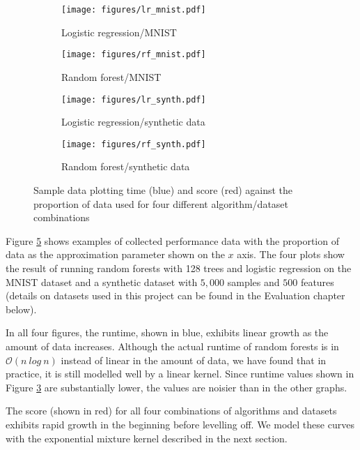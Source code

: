 \documentclass[a4paper,12pt,twoside,openright]{report}
\begin{document}
\begin{figure}[t]
\centering
\begin{subfigure}{.45\textwidth}
  \centering
  \texttt{[image: figures/lr\_mnist.pdf]}
  \caption{Logistic regression/MNIST}
  \label{sampledata1}
\end{subfigure}%
\begin{subfigure}{.45\textwidth}
  \centering
  \texttt{[image: figures/rf\_mnist.pdf]}
  \caption{Random forest/MNIST}
  \label{sampledata2}
\end{subfigure}
\begin{subfigure}{.45\textwidth}
  \centering
  \texttt{[image: figures/lr\_synth.pdf]}
  \caption{Logistic regression/synthetic data}
  \label{sampledata3}
\end{subfigure}
\begin{subfigure}{.45\textwidth}
  \centering
  \texttt{[image: figures/rf\_synth.pdf]}
  \caption{Random forest/synthetic data}
  \label{sampledata4}
\end{subfigure}
\caption{Sample data plotting time (blue) and score (red) against the proportion of data used for four different algorithm/dataset combinations}
\label{sampledata}
\end{figure}



Figure \ref{sampledata} shows examples of collected performance data with the proportion of data as the approximation parameter shown on the $x$ axis. The four plots show the result of running random forests with 128 trees and logistic regression on the MNIST dataset and a synthetic dataset with $5,000$ samples and $500$ features (details on datasets used in this project can be found in the Evaluation chapter below).

In all four figures, the runtime, shown in blue, exhibits linear growth as the amount of data increases. Although the actual runtime of random forests is in $\mathcal{O}(n\ log\ n)$ instead of linear in the amount of data, we have found that in practice, it is still modelled well by a linear kernel. Since runtime values shown in Figure \ref{sampledata3} are substantially lower, the values are noisier than in the other graphs. 

The score (shown in red) for all four combinations of algorithms and datasets exhibits rapid growth in the beginning before levelling off. We model these curves with the exponential mixture kernel described in the next section.
\end{document}
